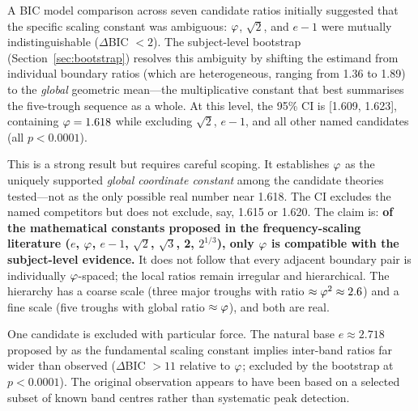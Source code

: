 A BIC model comparison across seven candidate ratios initially suggested that the specific scaling constant was ambiguous: $\varphi$, $\sqrt{2}$, and $e - 1$ were mutually indistinguishable ($\Delta$BIC $< 2$). The subject-level bootstrap (Section~\ref{sec:bootstrap}) resolves this ambiguity by shifting the estimand from individual boundary ratios (which are heterogeneous, ranging from 1.36 to 1.89) to the \emph{global} geometric mean---the multiplicative constant that best summarises the five-trough sequence as a whole. At this level, the 95\% CI is [1.609, 1.623], containing $\varphi = 1.618$ while excluding $\sqrt{2}$, $e - 1$, and all other named candidates (all $p < 0.0001$).

This is a strong result but requires careful scoping. It establishes $\varphi$ as the uniquely supported \emph{global coordinate constant} among the candidate theories tested---not as the only possible real number near 1.618. The CI excludes the named competitors but does not exclude, say, 1.615 or 1.620. The claim is: \textbf{of the mathematical constants proposed in the frequency-scaling literature ($e$, $\varphi$, $e-1$, $\sqrt{2}$, $\sqrt{3}$, 2, $2^{1/3}$), only $\varphi$ is compatible with the subject-level evidence.} It does not follow that every adjacent boundary pair is individually $\varphi$-spaced; the local ratios remain irregular and hierarchical. The hierarchy has a coarse scale (three major troughs with ratio $\approx \varphi^2 \approx 2.6$) and a fine scale (five troughs with global ratio $\approx \varphi$), and both are real.

One candidate is excluded with particular force. The natural base $e \approx 2.718$ proposed by \textcite{penttonen2003natural} as the fundamental scaling constant implies inter-band ratios far wider than observed ($\Delta$BIC $> 11$ relative to $\varphi$; excluded by the bootstrap at $p < 0.0001$). The original observation appears to have been based on a selected subset of known band centres rather than systematic peak detection.

